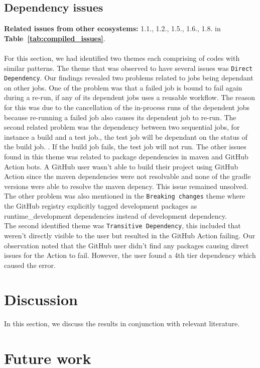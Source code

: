 \documentclass[conference]{IEEEtran}
\begin{document}
\subsection*{\textbf{Dependency issues}}
\textbf{Related issues from other ecosystems:} 1.1., 1.2., 1.5., 1.6., 1.8. in \textbf{Table~\ref{tab:compiled_issues}}.\\\\
For this section, we had identified two themes each comprising of codes with similar patterns. The theme that was observed to have several issues was \texttt{Direct Dependency}. Our findings revealed  two problems related  to jobs being dependant on other jobs. One of the problem was that a failed job is bound to fail again during a re-run, if any of its dependent jobs uses a reusable workflow. The reason for this was due to the cancellation of the in-process runs of the dependent jobs because re-running a failed job also causes its dependent job to re-run.  The second related problem was the dependency between two sequential jobs, for instance a build and a test job., the test job will be dependant on the status of the build job. . If the build job fails, the test job will not run. The other issues found in this theme was related to package dependencies in maven and GitHub Action bots. A GitHub user wasn't able to build their project using GitHub Action since the maven dependencies were not resolvable and none of the gradle versions were able to resolve the maven depency. This issue remained unsolved. The other problem was also mentioned in the \texttt{Breaking changes} theme where the GitHub registry explicitly tagged development packages as runtime\_development dependencies instead of development dependency.\\
The second identified theme was \texttt{Transitive Dependency}, this included that weren't directly visible to the user but resulted in the GitHub Action failing. Our observation noted that the GitHub user didn't find any packages causing direct issues for the Action to fail. However, the user found a 4th tier dependency which caused the error.

\section{Discussion}
	
In this section, we discuss the results in conjunction with relevant literature.

\section{Future work}
\end{document}
